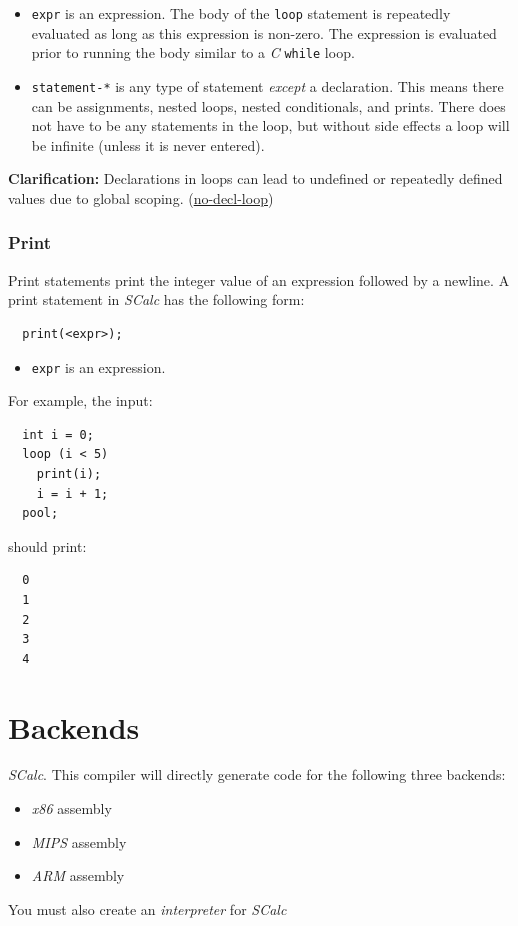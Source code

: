 \documentclass{article}
\newcommand{\code}[1]{\texttt{\textmd{#1}}}
\newcommand{\clarification}[2]{\textbf{Clarification: }#1 (\hyperlink{#2}{#2})}
\begin{document}
\begin {itemize}
  \item
  \code{expr} is an expression. The body of the \code{loop} statement is repeatedly evaluated as
  long as this expression is non-zero. The expression is evaluated prior to running the body
  similar to a \textit{C} \code{while} loop.
  \item
    \code{statement-*} is any type of statement \textit{except} a declaration. This means there can
    be assignments, nested loops, nested conditionals, and prints. There does not have to be any
    statements in the loop, but without side effects a loop will be infinite (unless it is never
    entered).
\end{itemize}

\clarification{Declarations in loops can lead to undefined or repeatedly defined values due to
global scoping.} {no-decl-loop}

\subsubsection{Print}
\label{sssec:print}
Print statements print the integer value of an expression followed by a newline. A print statement
in \textit{SCalc} has the following form:
\begin{lstlisting}
  print(<expr>);
\end{lstlisting}

\begin{itemize}
  \item \code{expr} is an expression.
\end{itemize}

For example, the input:
\begin{lstlisting}
  int i = 0;
  loop (i < 5)
    print(i);
    i = i + 1;
  pool;
\end{lstlisting}
should print:
\begin{lstlisting}
  0
  1
  2
  3
  4
\end{lstlisting}

\section{Backends}

\textit{SCalc}. This compiler will directly generate code for the following three backends:
\begin {itemize}
  \item \textit{x86} assembly
  \item \textit{MIPS} assembly
  \item \textit{ARM} assembly
\end {itemize}
You must also create an \textit{interpreter} for \textit{SCalc}
\end{document}
